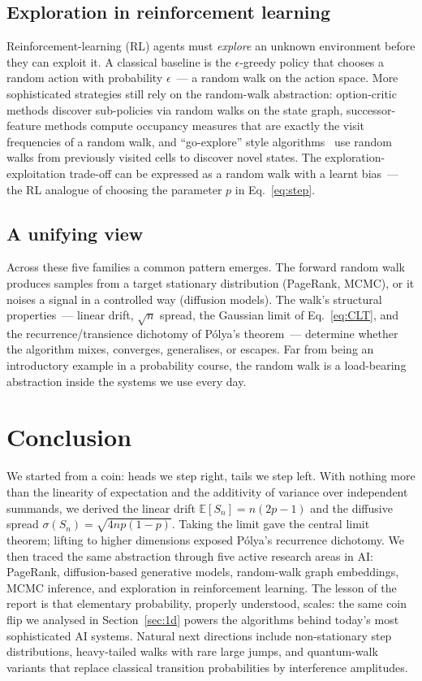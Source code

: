 \documentclass[conference,a4paper,10pt]{IEEEtran}
\begin{document}
\subsection{Exploration in reinforcement learning}
Reinforcement-learning (RL) agents must \emph{explore} an unknown
environment before they can exploit it. A classical baseline is the
$\epsilon$-greedy policy that chooses a random action with probability
$\epsilon$~--- a random walk on the action space. More sophisticated
strategies still rely on the random-walk abstraction: option-critic
methods discover sub-policies via random walks on the state graph,
successor-feature methods compute occupancy measures that are exactly
the visit frequencies of a random walk, and ``go-explore'' style
algorithms~\cite{ecoffet2021goexplore} use random walks from previously
visited cells to discover novel states. The exploration-exploitation
trade-off can be expressed as a random walk with a learnt bias~--- the
RL analogue of choosing the parameter $p$ in
Eq.~\eqref{eq:step}.

\subsection{A unifying view}
Across these five families a common pattern emerges. The forward random
walk produces samples from a target stationary distribution (PageRank,
MCMC), or it noises a signal in a controlled way (diffusion models). The
walk's structural properties~--- linear drift, $\sqrt{n}$ spread, the
Gaussian limit of Eq.~\eqref{eq:CLT}, and the recurrence/transience
dichotomy of P\'{o}lya's theorem~--- determine whether the algorithm
mixes, converges, generalises, or escapes. Far from being an introductory
example in a probability course, the random walk is a load-bearing
abstraction inside the systems we use every day.

\section{Conclusion}\label{sec:conclusion}
We started from a coin: heads we step right, tails we step left. With
nothing more than the linearity of expectation and the additivity of
variance over independent summands, we derived the linear drift
$\mathbb{E}[S_{n}]=n(2p-1)$ and the diffusive spread
$\sigma(S_{n})=\sqrt{4np(1-p)}$. Taking the limit gave the central limit
theorem; lifting to higher dimensions exposed P\'{o}lya's recurrence
dichotomy. We then traced the same abstraction through five active
research areas in AI: PageRank, diffusion-based generative models, random-walk
graph embeddings, MCMC inference, and exploration in reinforcement
learning. The lesson of the report is that elementary probability,
properly understood, scales: the same coin flip we analysed in
Section~\ref{sec:1d} powers the algorithms behind today's most
sophisticated AI systems. Natural next directions include non-stationary
step distributions, heavy-tailed walks with rare large jumps, and
quantum-walk variants that replace classical transition probabilities by
interference amplitudes.
\end{document}
